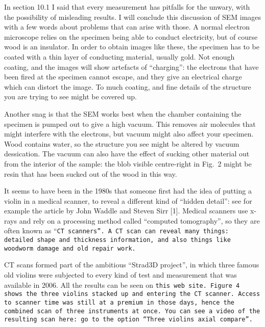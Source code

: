   In section 10.1 I said that every measurement has pitfalls for the unwary, 
  with the possibility of misleading results. I will conclude this discussion 
  of SEM images with a few words about problems that can arise with those. A 
  normal electron microscope relies on the specimen being able to conduct 
  electricity, but of course wood is an insulator. In order to obtain images 
  like these, the specimen has to be coated with a thin layer of conducting 
  material, usually gold. Not enough coating, and the images will show 
  artefacts of ``charging'': the electrons that have been fired at the specimen 
  cannot escape, and they give an electrical charge which can distort the 
  image. To much coating, and fine details of the structure you are trying to 
  see might be covered up. 

  Another snag is that the SEM works best when the chamber containing the 
  specimen is pumped out to give a high vacuum. This removes air molecules that 
  might interfere with the electrons, but vacuum might also affect your 
  specimen. Wood contains water, so the structure you see might be altered by 
  vacuum dessication. The vacuum can also have the effect of sucking other 
  material out from the interior of the sample: the blob visible centre-right 
  in Fig.\ 2 might be resin that has been sucked out of the wood in this way. 

  It seems to have been in the 1980s that someone first had the idea of putting 
  a violin in a medical scanner, to reveal a different kind of “hidden detail”: 
  see for example the article by John Waddle and Steven Sirr [1]. Medical 
  scanners use x-rays and rely on a processing method called “computed 
  tomography”, so they are often known as “\tt{}CT scanners\rm{}”. A CT scan 
  can reveal many things: detailed shape and thickness information, and also 
  things like woodworm damage and old repair work. 


  CT scans formed part of the ambitious “Strad3D project”, in which three 
  famous old violins were subjected to every kind of test and measurement that 
  was available in 2006. All the results can be seen on \tt{}this web 
  site\rm{}. Figure 4 shows the three violins stacked up and entering the CT 
  scanner. Access to scanner time was still at a premium in those days, hence 
  the combined scan of three instruments at once. You can see a video of the 
  resulting scan \tt{}here\rm{}: go to the option “Three violins axial 
  compare”. 

